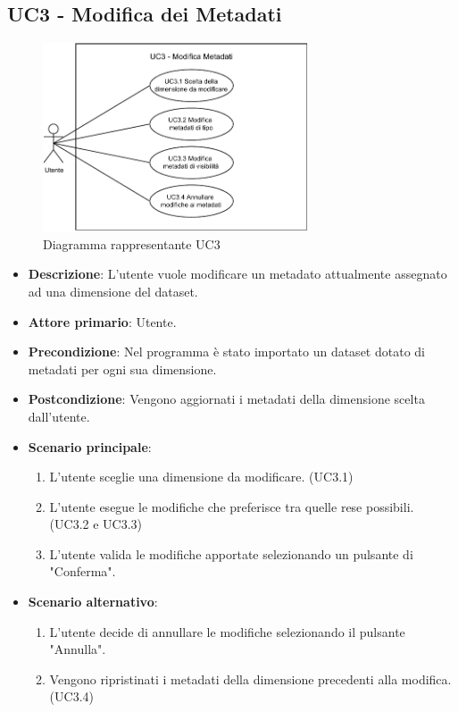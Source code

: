 \newpage
\subsection{UC3 - Modifica dei Metadati}
\label{subsec:uc3}

\begin{figure}[h]
    \centering
    \includegraphics[width=0.7\textwidth]{componenti/casi-duso/diagrammi/UC3.pdf}
    \caption{Diagramma rappresentante UC3}
    \label{fig:UC3}
\end{figure}

\begin{itemize}
    \item \textbf{Descrizione}: L’utente vuole modificare un metadato attualmente assegnato ad una dimensione del dataset.
	
    \item \textbf{Attore primario}: Utente.
    
    \item \textbf{Precondizione}:   Nel programma è stato importato un dataset dotato di metadati per ogni sua dimensione.
    \item \textbf{Postcondizione}:  Vengono aggiornati i metadati della dimensione scelta dall'utente.

	\item \textbf{Scenario principale}:
        \begin{enumerate}
                \item L'utente sceglie una dimensione da modificare. (UC3.1)
                \item L'utente esegue le modifiche che preferisce tra quelle rese possibili. (UC3.2 e UC3.3)
                \item L'utente valida le modifiche apportate selezionando un pulsante di "Conferma".
        \end{enumerate}
    
    \item \textbf{Scenario alternativo}:
		\begin{enumerate}
			\item L'utente decide di annullare le modifiche selezionando il pulsante "Annulla". 
			\item Vengono ripristinati i metadati della dimensione precedenti alla modifica. (UC3.4)
        \end{enumerate}
\end{itemize}

